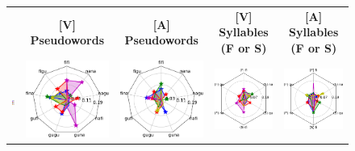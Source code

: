 \hspace{-5ex}
\begin{figure}[ht]
\scriptsize
\hspace{0ex}
\begin{tabular}{lcccc}
{} & \textbf{\Large [V] Pseudowords} & \textbf{\Large [A] Pseudowords} & \textbf{\Large [V] Syllables (F or S)} & \textbf{\Large [A] Syllables (F or S)}\\
\vspace{2ex}
\hspace{-4ex}
{\includegraphics[width=.07\linewidth]{figures/part_II/subjects_legend.pdf}}
\hspace{-4ex}
&{\includegraphics[width=.23\linewidth]{figures/part_II/roi_plots/Broca44/Vis/radial_word.pdf}}
\hspace{-4ex}
&{\includegraphics[width=.23\linewidth]{figures/part_II/roi_plots/Broca44/Aud/radial_word.pdf}}
\hspace{-4ex}
&{\includegraphics[width=.23\linewidth]{figures/part_II/roi_plots/Broca44/Vis/radial_joint.pdf}}
\hspace{-4ex}
&{\includegraphics[width=.23\linewidth]{figures/part_II/roi_plots/Broca44/Aud/radial_joint.pdf}}

\end{tabular}
\end{figure}
